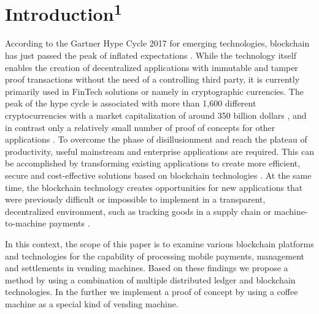 \section{Introduction\textsuperscript{1}}
According to the Gartner Hype Cycle 2017 for emerging technologies, blockchain has just passed the peak of inflated expectations \cite{TopTrend28:online}. While the technology itself enables the creation of decentralized applications with immutable and tamper proof transactions without the need of a controlling third party, it is currently primarily used in FinTech solutions or namely in cryptographic currencies. The peak of the hype cycle is associated with more than 1,600 different cryptocurrencies with a market capitalization of around 350 billion dollars \cite{AllCrypt83:online}, and in contrast only a relatively small number of proof of concepts for other applications \cite{8338177,8016254,8306880,DBLP:journals/corr/abs-1804-00658,PlaTIBART}. To overcome the phase of disillusionment and reach the plateau of productivity, useful mainstream and enterprise applications are required. This can be accomplished by transforming existing applications to create more efficient, secure and cost-effective solutions based on blockchain technologies \cite{REYNA2018173}. At the same time, the blockchain technology creates opportunities for new applications that were previously difficult or impossible to implement in a transparent, decentralized environment, such as tracking goods in a supply chain \cite{doi:10.1002/isaf.1424} or machine-to-machine payments \cite{8016254}.

In this context, the scope of this paper is to examine various blockchain platforms and technologies for the capability of processing mobile payments, management and settlements in vending machines. Based on these findings we propose a method by using a combination of multiple distributed ledger and blockchain technologies. In the further we implement a proof of concept by using a coffee machine as a special kind of vending machine. 